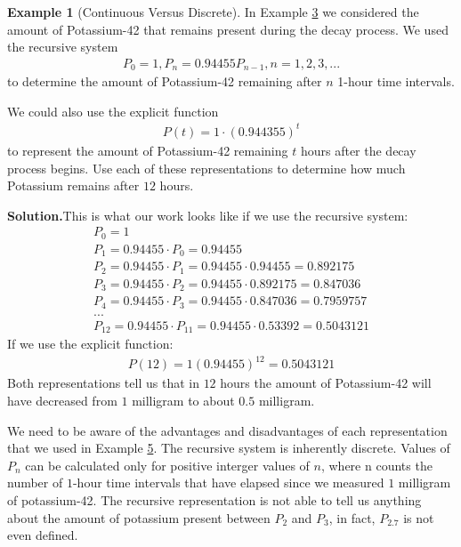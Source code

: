\documentclass[10pt,]{book}
\theoremstyle{plain}
\theoremstyle{definition}
\theoremstyle{definition}
\newtheorem{example}[theorem]{Example}
\theoremstyle{definition}
\numberwithin{equation}{section}
\begin{document}
\begin{example}[Continuous Versus Discrete]\label{example-continuous-discrete}
In Example \hyperref[example-radioactive-decay]{3} we considered the amount of Potassium-42 that remains present during the decay process.  We used the recursive system%
%
\begin{gather*}
P_0=1, P_n=0.94455P_{n-1}, n=1,2,3,...
\end{gather*}
to determine the amount of Potassium-42 remaining after \(n\) 1-hour time intervals.%
\par
We could also use the explicit function%
%
\begin{gather*}
P(t)=1 \cdot (0.944355)^t
\end{gather*}
to represent the amount of Potassium-42 remaining \(t\) hours after the decay process begins. Use each of these representations to determine how much Potassium remains after \(12\) hours.%
\par\medskip\noindent%
\textbf{Solution.}\quad This is what our work looks like if we use the recursive system:%
%
\begin{gather*}
P_0=1\\
P_1=0.94455 \cdot P_0 = 0.94455\\
P_2=0.94455 \cdot P_1 = 0.94455 \cdot 0.94455 = 0.892175\\
P_3=0.94455 \cdot P_2 = 0.94455 \cdot 0.892175 = 0.847036\\
P_4=0.94455 \cdot P_3 = 0.94455 \cdot 0.847036 = 0.7959757\\
...\\
P_{12}=0.94455 \cdot P_{11} = 0.94455 \cdot 0.53392 = 0.5043121
\end{gather*}
If we use the explicit function:%
%
\begin{gather*}
P(12)=1(0.94455)^{12} = 0.5043121
\end{gather*}
Both representations tell us that in \(12\) hours the amount of Potassium-42 will have decreased from \(1\) milligram to about \(0.5\) milligram.%
\par
We need to be aware of the advantages and disadvantages of each representation that we used in Example \hyperref[example-one-time-bank-desposit]{5}. The recursive system is inherently discrete.  Values of \(P_n\) can be calculated only for positive interger values of \(n\), where n counts the number of \(1\)-hour time intervals that have elapsed since we measured \(1\) milligram of potassium-42. The recursive representation is not able to tell us anything about the amount of potassium present between \(P_2\) and \(P_3\), in fact, \(P_{2.7}\) is not even defined.%

\end{example}
\end{document}
